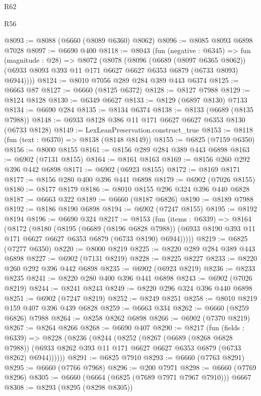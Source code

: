 \begin{lexlean}{R62}
\begin{lexlean}{R56}
\begin{coremodule}
{{{{{{{{{{{{{{{{{{{{{{{{{{{{{{{{{{{{{{{{{{{{{{{{{{{{{{{{{{{{{{{{{{{{{{{{{{{{{{{{{{{{{{{{{{{{{{{{{{{{{{{{{{{{{{{{{{{{{{{{{{{{{{{{{{{{{{{{{{{{{{{{{{{{{{{{{{{{{{{{{{{{{{{{{{{{{{{{{{{{{{{{{{{{{{{{{{{{{{{{{{{{{{{{{{{@8093 := @8088 (@6660 (@8089 @6360) @8062)
@8096 := @8085 @8093 @6898 @7028
@8097 := @6690 @400
@8118 := @8043
    (fun (negative : @6345) =>
    fun (magnitude : @28) =>
    @8072
      (@8078
        (@8096
          (@6689 (@8097 @6365 @8062))
          (@6933 @8093 @393 @11 @171 @6627 @6627 @6353 @6879 (@6733 @8093) @6944))))
@8124 := @8010 @7056 @289 @284 @389 @443 @6374
@8125 := @6663 @87
@8127 := @6660 (@8125 @6372)
@8128 := @8127 @7988
@8129 := @8124 @8128
@8130 := @6349 @6627
@8133 := @8129 (@6897 @8130) @7133
@8134 := @6690 @284
@8135 := @8134 @6374
@8138 := @8133 (@6689 (@8135 @7988))
@8148 := @6933 @8128 @386 @11 @171 @6627 @6627 @6353 @8130 (@6733 @8128)
@8149 := LexLeanPreservation.construct_true
@8153 := @8118 (fun (text : @6370) => @8138 (@8148 @8149))
@8155 := @6825 (@7159 @6350)
@8156 := @8000 @8155
@8161 := @8156 @289 @284 @389 @443 @6898
@8163 := @6902 (@7131 @8155)
@8164 := @8161 @8163
@8169 := @8156 @260 @292 @396 @442 @6898
@8171 := @6902 (@6923 @8155)
@8172 := @8169 @8171
@8177 := @8156 @280 @400 @396 @441 @6898
@8179 := @6902 (@7026 @8155)
@8180 := @8177 @8179
@8186 := @8010 @8155 @296 @324 @396 @440 @6828
@8187 := @6663 @322
@8189 := @6660 (@8187 @6826)
@8190 := @8189 @7988
@8192 := @8186 @8190 @6898
@8194 := @6902 (@7247 @8155)
@8195 := @8192 @8194
@8196 := @6690 @324
@8217 := @8153
    (fun (items : @6339) =>
    @8164
      (@8172
        (@8180
          (@8195
            (@6689 (@8196 @6828 @7988))
            (@6933 @8190 @393 @11 @171 @6627 @6627 @6353 @6879 (@6733 @8190) @6944)))))
@8219 := @6825 (@7277 @6350)
@8220 := @8000 @8219
@8225 := @8220 @289 @284 @389 @443 @6898
@8227 := @6902 (@7131 @8219)
@8228 := @8225 @8227
@8233 := @8220 @260 @292 @396 @442 @6898
@8235 := @6902 (@6923 @8219)
@8236 := @8233 @8235
@8241 := @8220 @280 @400 @396 @441 @6898
@8243 := @6902 (@7026 @8219)
@8244 := @8241 @8243
@8249 := @8220 @296 @324 @396 @440 @6898
@8251 := @6902 (@7247 @8219)
@8252 := @8249 @8251
@8258 := @8010 @8219 @159 @407 @396 @439 @6828
@8259 := @6663 @334
@8262 := @6660 (@8259 @6826) @7988
@8264 := @8258 @8262 @6898
@8266 := @6902 (@7370 @8219)
@8267 := @8264 @8266
@8268 := @6690 @407
@8290 := @8217
    (fun (fields : @6339) =>
    @8228
      (@8236
        (@8244
          (@8252
            (@8267
              (@6689 (@8268 @6828 @7988))
              (@6933 @8262 @393 @11 @171 @6627 @6627 @6353 @6879 (@6733 @8262) @6944))))))
@8291 := @6825 @7910
@8293 := @6660 (@7763 @8291)
@8295 := @6660 (@7766 @7968)
@8296 := @200 @7971
@8298 := @6660 (@7769 @8296)
@8305 := @6660 (@6664 (@6825 (@7689 @7971 @7967 @7910))) @6667
@8308 := @8293 (@8295 (@8298 @8305))
}}}}}}}}}}}}}}}}}}}}}}}}}}}}}}}}}}}}}}}}}}}}}}}}}}}}}}}}}}}}}}}}}}}}}}}}}}}}}}}}}}}}}}}}}}}}}}}}}}}}}}}}}}}}}}}}}}}}}}}}}}}}}}}}}}}}}}}}}}}}}}}}}}}}}}}}}}}}}}}}}}}}}}}}}}}}}}}}}}}}}}}}}}}}}}}}}}}}}}}}}}}}}}}}}}}
\end{coremodule}
\end{lexlean}
\end{lexlean}
